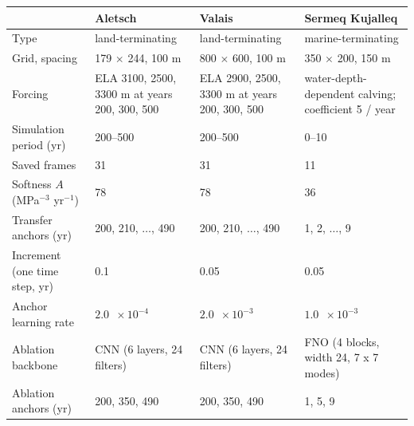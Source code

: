 \begin{tabular}{@{}p{.25\linewidth}p{.22\linewidth}p{.22\linewidth}p{.22\linewidth}@{}}
\toprule
 & Aletsch & Valais & Sermeq Kujalleq\\
\midrule
Type & land-terminating & land-terminating & marine-terminating \\
Grid, spacing & 179 $\times$ 244, 100 m & 800 $\times$ 600, 100 m & 350 $\times$ 200, 150 m \\
Forcing & ELA 3100, 2500, 3300 m at years 200, 300, 500 & ELA 2900, 2500, 3300 m at years 200, 300, 500 & water-depth-dependent calving; coefficient 5 / year \\
Simulation period (yr) & 200--500 & 200--500 & 0--10 \\
Saved frames & 31 & 31 & 11 \\
Softness $A$ (MPa$^{-3}$ yr$^{-1}$) & 78 & 78 & 36 \\
Transfer anchors (yr) & 200, 210, $\ldots$, 490 & 200, 210, $\ldots$, 490 & 1, 2, $\ldots$, 9 \\
Increment (one time step, yr) & 0.1 & 0.05 & 0.05 \\
Anchor learning rate & $2.0\phantom{0}\times10^{-4}$ & $2.0\phantom{0}\times10^{-3}$ & $1.0\phantom{0}\times10^{-3}$ \\
Ablation backbone & CNN (6 layers, 24 filters) & CNN (6 layers, 24 filters) & FNO (4 blocks, width 24, 7 x 7 modes) \\
Ablation anchors (yr) & 200, 350, 490 & 200, 350, 490 & 1, 5, 9 \\
\bottomrule
\end{tabular}
